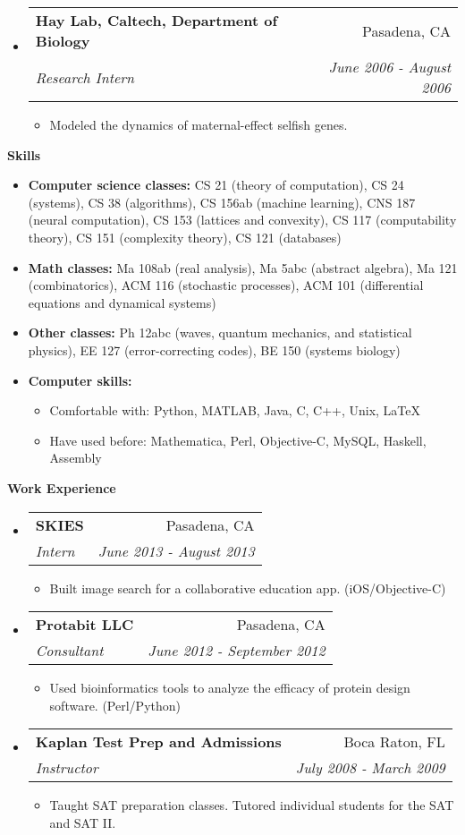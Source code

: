 \documentclass[letterpaper,11pt]{article}
\makeatletter
\newcommand{\resitem}[1]{\item #1 \vspace{-2pt}}
\newcommand{\resheading}[1]{{\large \colorbox{mygrey}{\begin{minipage}{\textwidth}{\textbf{#1 \vphantom{p\^{E}}}}\end{minipage}}}}
\newcommand{\ressubheading}[4]{
\begin{tabular*}{7.0in}{l@{\extracolsep{\fill}}r}
		\textbf{#1} & #2 \\
		\textit{#3} & \textit{#4} \\
\end{tabular*}\vspace{-6pt}}
\makeatother
\begin{document}
\begin{itemize}
\item
	\ressubheading{Hay Lab, Caltech, Department of Biology}{Pasadena, CA}{Research Intern}{June 2006 - August 2006}
	\begin{itemize}
		\resitem{Modeled the dynamics of maternal-effect selfish genes.}
	\end{itemize}

\end{itemize}

\resheading{Skills}
\begin{itemize}
\item \textbf{Computer science classes:} CS 21 (theory of computation), CS 24 (systems), CS 38 (algorithms), CS 156ab (machine learning), CNS 187 (neural computation), CS 153 (lattices and convexity), CS 117 (computability theory), CS 151 (complexity theory), CS 121 (databases)
\item \textbf{Math classes:}  Ma 108ab (real analysis), Ma 5abc (abstract algebra), Ma 121 (combinatorics), ACM 116 (stochastic processes), ACM 101 (differential equations and dynamical systems)
\item \textbf{Other classes:} Ph 12abc (waves, quantum mechanics, and statistical physics), EE 127 (error-correcting codes), BE 150 (systems biology)
\item \textbf{Computer skills:}
	\begin{itemize}
	\item Comfortable with: Python, MATLAB, Java, C, C++, Unix, LaTeX
	\item Have used before: Mathematica, Perl, Objective-C, MySQL, Haskell, Assembly
	\end{itemize}
\end{itemize}

\resheading{Work Experience}
\begin{itemize}
\item
	\ressubheading{SKIES}{Pasadena, CA}{Intern}{June 2013 - August 2013}
	\begin{itemize}
		\resitem{Built image search for a collaborative education app.  (iOS/Objective-C)}
	\end{itemize}
\item
	\ressubheading{Protabit LLC}{Pasadena, CA}{Consultant}{June 2012 - September 2012}
	\begin{itemize}
		\resitem{Used bioinformatics tools to analyze the efficacy of protein design software.  (Perl/Python)}
	\end{itemize}
\item
	\ressubheading{Kaplan Test Prep and Admissions}{Boca Raton, FL}{Instructor}{July 2008 - March 2009}
	\begin{itemize}
		\resitem{Taught SAT preparation classes.  Tutored individual students for the SAT and SAT II.}
	\end{itemize}
\end{itemize}
\end{document}
